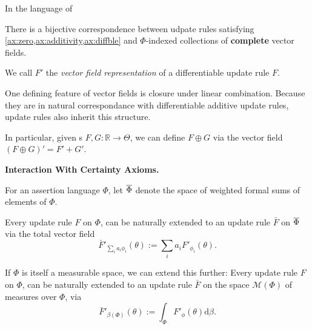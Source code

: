 In the language of 

\begin{coro}\label{thm:vecrep}
There is a bijective correspondence between udpate rules satisfying \cref{ax:zero,ax:additivity,ax:diffble} and $\Phi$-indexed collections of \textbf{complete} vector fields.
\end{coro}

We call $F'$ the \emph{vector field representation} of a differentiable update rule $F$.

One defining feature of vector fields is closure under linear
combination.
Because they are in natural correspondance with differentiable additive update rules, update rules also inherit this structure.

In particular, given \cofunc s $F, G : \mathbb R \to \Theta$, we can define
$F \oplus G$ via the vector field $(F \oplus G)' = F' + G'$.

\begin{wip}
\textbf{Interaction With Certainty Axioms.}

\end{wip}

\begin{defn}
For an assertion language $\Phi$, let $\overline \Phi$ denote
the space of weighted formal sums of elements of $\Phi$.
\end{defn}

\begin{prop}
Every  update rule $F$ on $\Phi$, can be naturally extended to an update rule
$\bar F$ on $\overline \Phi$
via the total vector field
\[
    \bar F'_{\textstyle\sum_i a_i \phi_i} ( \theta ) := \sum_{i} a_i F'_{\phi_i}(\theta).
\]
%
\end{prop}

If $\Phi$ is itself a measurable space, we can extend this further:
Every  update rule $F$ on $\Phi$, can be naturally extended to an update rule $\bar F$ on the space $\mathcal M(\Phi)$ of measures over $\Phi$, via
\[
\bar F'_{\beta(\Phi)}( \theta ) := \int_{\Phi} F'_\phi(\theta) \mathrm d\beta.
\]



